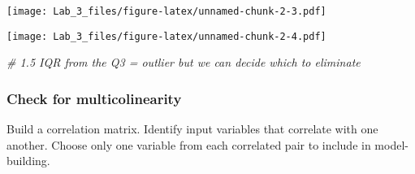 \documentclass[]{article}
\newenvironment{Shaded}{\begin{snugshade}}{\end{snugshade}}
\newcommand{\KeywordTok}[1]{\textcolor[rgb]{0.13,0.29,0.53}{\textbf{#1}}}
\newcommand{\DataTypeTok}[1]{\textcolor[rgb]{0.13,0.29,0.53}{#1}}
\newcommand{\StringTok}[1]{\textcolor[rgb]{0.31,0.60,0.02}{#1}}
\newcommand{\CommentTok}[1]{\textcolor[rgb]{0.56,0.35,0.01}{\textit{#1}}}
\newcommand{\OperatorTok}[1]{\textcolor[rgb]{0.81,0.36,0.00}{\textbf{#1}}}
\newcommand{\NormalTok}[1]{#1}
\begin{document}
\texttt{[image: Lab\_3\_files/figure-latex/unnamed-chunk-2-3.pdf]}

\begin{Shaded}
\end{Shaded}

\texttt{[image: Lab\_3\_files/figure-latex/unnamed-chunk-2-4.pdf]}

\begin{Shaded}
\begin{Highlighting}[]
\CommentTok{# 1.5 IQR from the Q3 = outlier but we can decide which to eliminate}
\end{Highlighting}
\end{Shaded}

\subsubsection{Check for
multicolinearity}\label{check-for-multicolinearity}

Build a correlation matrix. Identify input variables that correlate with
one another. Choose only one variable from each correlated pair to
include in model-building.
\end{document}
